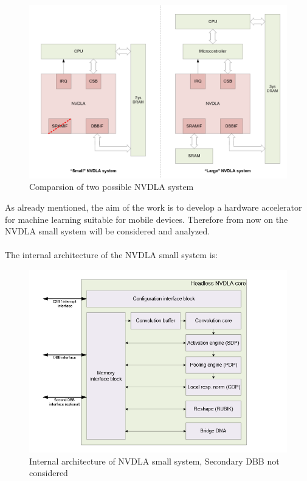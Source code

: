 \begin{figure}[!htbp]
\centering
\captionsetup{justification=centering}
\includegraphics[scale=0.35]{./figure/nvdla_system.PNG}
\caption{Comparsion of two possible NVDLA system \cite{WEBSITE:8}}
\label{fig:nvdlasystem}
\end{figure}
As already mentioned, the aim of the work is to develop a hardware accelerator for machine learning suitable for mobile devices. Therefore from now on the NVDLA small system will be considered and analyzed.\\\\
The internal architecture of the NVDLA small system is:
\begin{figure}[!htbp]
\centering
\captionsetup{justification=centering}
\includegraphics[scale=0.4]{./figure/nvdla_internal.PNG}
\centering\caption{Internal architecture of NVDLA small system, Secondary DBB not considered \cite{WEBSITE:8}}
\label{fig:nvdlaarch}
\end{figure}


